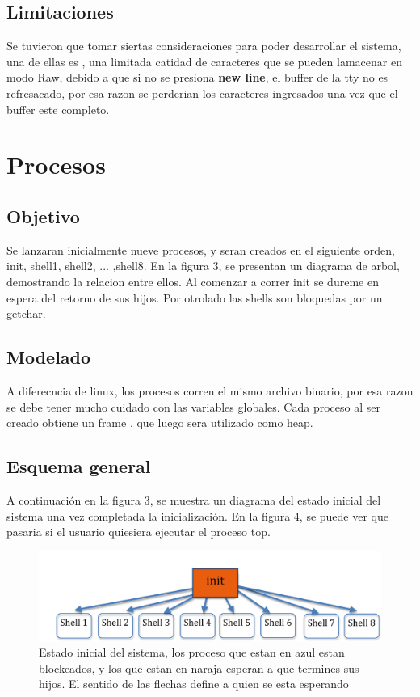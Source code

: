 \documentclass[10pt,a4paper]{article}
\begin{document}
	\subsection{Limitaciones}
		Se tuvieron que tomar siertas consideraciones para poder desarrollar el sistema, una de ellas es , una limitada catidad de caracteres que se pueden lamacenar en modo Raw, debido a que si no se presiona \textbf{new line}, el buffer de la tty no es refresacado, por esa razon se perderian los caracteres ingresados una vez que el buffer este completo.
\section{Procesos}
	\subsection{Objetivo}
	Se lanzaran inicialmente nueve procesos, y seran creados en el siguiente orden, init, shell1, shell2, ... ,shell8. En la figura 3, se presentan un diagrama de arbol, demostrando la relacion entre ellos. Al comenzar a correr init se dureme en espera del retorno de sus hijos. Por otrolado las shells son bloquedas por un getchar.
	\subsection{Modelado}
	A diferecncia de linux, los procesos corren el mismo archivo binario, por esa razon se debe tener mucho cuidado con las variables globales. Cada proceso al ser creado obtiene un frame , que luego sera utilizado como heap. 
	\subsection{Esquema general}
	A continuaci\'on en la figura 3,  se muestra un diagrama del estado inicial del sistema una vez completada la inicializaci\'on. En la figura 4, se puede ver que pasaria si el usuario quiesiera ejecutar el proceso top.
	
		\begin{figure}
	\begin{center} 
	\includegraphics[angle=0, width=1\textwidth ]{procesos.png} 
	\caption{ Estado inicial del sistema, los proceso que estan en azul estan blockeados, y los que estan en naraja esperan a que termines sus hijos. El sentido de las flechas define a quien se esta esperando }
	\end{center} 
	\end{figure}
	
\end{document}

